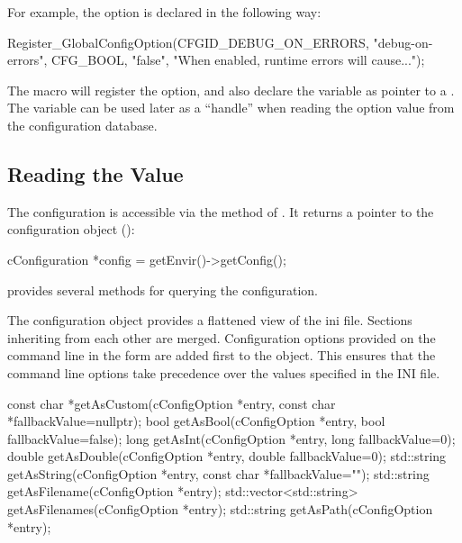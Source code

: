 For example, the  option is declared in the following way:

\begin{cpp}
Register_GlobalConfigOption(CFGID_DEBUG_ON_ERRORS, "debug-on-errors",
    CFG_BOOL, "false", "When enabled, runtime errors will cause...");
\end{cpp}

The macro will register the option, and also declare the
 variable as pointer to a
. The variable can be used later as a ``handle'' when
reading the option value from the configuration database.

\subsection{Reading the Value}
\label{sec:plugin-exts:configoption:reading-values}

The configuration is accessible via the  method of .
It returns a pointer to the configuration object ():

\begin{cpp}
cConfiguration *config = getEnvir()->getConfig();
\end{cpp}

 provides several methods for querying the configuration.

\begin{note}
The configuration object provides a flattened view of the ini file. Sections
inheriting from each other are merged. Configuration options provided
on the command line in the form  are added first to the object.
This ensures that the command line options take precedence over the values specified
in the INI file.
\end{note}

\begin{cpp}
const char *getAsCustom(cConfigOption *entry, const char *fallbackValue=nullptr);
bool getAsBool(cConfigOption *entry, bool fallbackValue=false);
long getAsInt(cConfigOption *entry, long fallbackValue=0);
double getAsDouble(cConfigOption *entry, double fallbackValue=0);
std::string getAsString(cConfigOption *entry, const char *fallbackValue="");
std::string getAsFilename(cConfigOption *entry);
std::vector<std::string> getAsFilenames(cConfigOption *entry);
std::string getAsPath(cConfigOption *entry);
\end{cpp}


